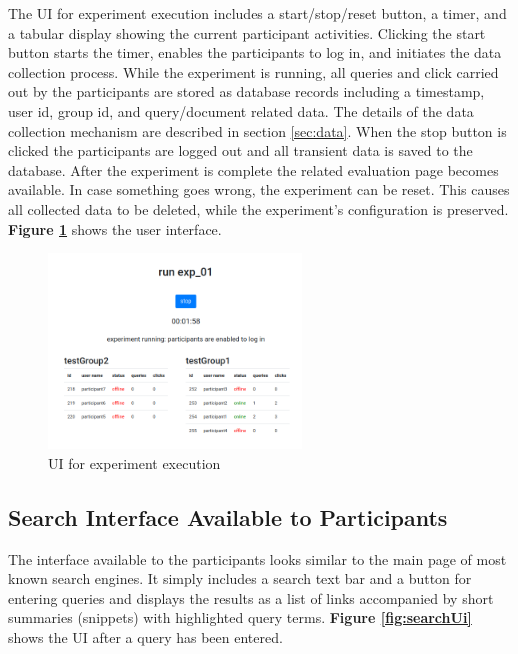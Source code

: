 \documentclass[a4paper]{usiinfbachelorproject}
\begin{document}
The UI for experiment execution includes a start/stop/reset button, a timer, and a tabular display 
showing the current participant activities. Clicking the start button starts the timer, enables the participants to log in, and
initiates the data collection process. While the experiment is running, all queries and click carried out by the
participants are stored as database records including a timestamp, user id, group id, and query/document related data.
The details of the data collection mechanism are described in section \ref{sec:data}.
When the stop button is clicked the participants are logged out and all transient data is saved to the database.
After the experiment is complete the related evaluation page becomes available.
In case something goes wrong, the experiment can be reset. This causes all collected data to be deleted, while the
experiment's configuration is preserved.
\textbf{Figure \ref{fig:run}} shows the user interface.

\begin{figure} [h]
\centering
\includegraphics[width=0.6\textwidth]{figures/run}
\caption{UI for experiment execution}
\label{fig:run}
\end{figure}

\subsection{\textbf{Search Interface Available to Participants}} \label{sec:designSearchUi}

The interface available to the participants looks similar to the main page of most known search engines. It simply
includes a search text bar and a button for entering queries and displays the results as a list of
links accompanied by short summaries (snippets) with highlighted query terms. 
\textbf{Figure \ref{fig:searchUi}} shows the UI after a query has been entered.
\end{document}

